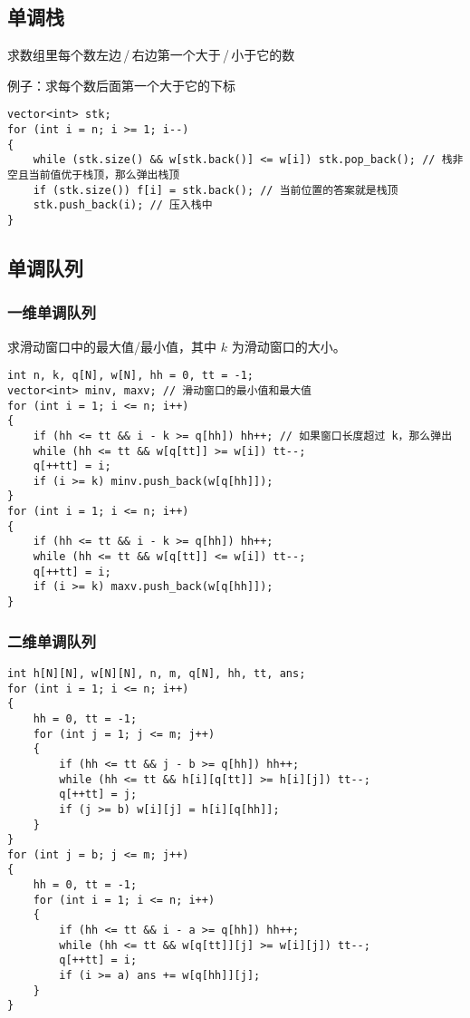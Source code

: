 \documentclass[a4paper, fontset=none]{ctexart}
\begin{document}
\subsection{单调栈}

求数组里每个数左边\,/\,右边第一个大于\,/\,小于它的数

例子：求每个数后面第一个大于它的下标
\begin{verbatim}
vector<int> stk;
for (int i = n; i >= 1; i--)
{
    while (stk.size() && w[stk.back()] <= w[i]) stk.pop_back(); // 栈非空且当前值优于栈顶，那么弹出栈顶
    if (stk.size()) f[i] = stk.back(); // 当前位置的答案就是栈顶
    stk.push_back(i); // 压入栈中
}
\end{verbatim}

\subsection{单调队列}
\subsubsection{一维单调队列}

求滑动窗口中的最大值/最小值，其中 $k$ 为滑动窗口的大小。
\begin{verbatim}
int n, k, q[N], w[N], hh = 0, tt = -1;
vector<int> minv, maxv; // 滑动窗口的最小值和最大值
for (int i = 1; i <= n; i++)
{
    if (hh <= tt && i - k >= q[hh]) hh++; // 如果窗口长度超过 k，那么弹出
    while (hh <= tt && w[q[tt]] >= w[i]) tt--;
    q[++tt] = i;
    if (i >= k) minv.push_back(w[q[hh]]);
}
for (int i = 1; i <= n; i++)
{
    if (hh <= tt && i - k >= q[hh]) hh++;
    while (hh <= tt && w[q[tt]] <= w[i]) tt--;
    q[++tt] = i;
    if (i >= k) maxv.push_back(w[q[hh]]);
}
\end{verbatim}
\subsubsection{二维单调队列}
\begin{verbatim}
int h[N][N], w[N][N], n, m, q[N], hh, tt, ans;
for (int i = 1; i <= n; i++)
{
    hh = 0, tt = -1;
    for (int j = 1; j <= m; j++)
    {
        if (hh <= tt && j - b >= q[hh]) hh++;
        while (hh <= tt && h[i][q[tt]] >= h[i][j]) tt--;
        q[++tt] = j;
        if (j >= b) w[i][j] = h[i][q[hh]];
    }
}
for (int j = b; j <= m; j++)
{
    hh = 0, tt = -1;
    for (int i = 1; i <= n; i++)
    {
        if (hh <= tt && i - a >= q[hh]) hh++;
        while (hh <= tt && w[q[tt]][j] >= w[i][j]) tt--;
        q[++tt] = i;
        if (i >= a) ans += w[q[hh]][j];
    }
}
\end{verbatim}
\end{document}

